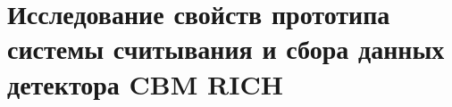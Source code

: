 \chapter{Исследование свойств прототипа системы считывания и сбора данных детектора CBM RICH}\label{sec:secAnalysisResults}










